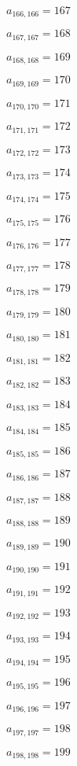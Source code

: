\documentclass[a4paper,12pt]{article}
\begin{document}
$a _{ 166, 166 } = 167$

$a _{ 167, 167 } = 168$

$a _{ 168, 168 } = 169$

$a _{ 169, 169 } = 170$

$a _{ 170, 170 } = 171$

$a _{ 171, 171 } = 172$

$a _{ 172, 172 } = 173$

$a _{ 173, 173 } = 174$

$a _{ 174, 174 } = 175$

$a _{ 175, 175 } = 176$

$a _{ 176, 176 } = 177$

$a _{ 177, 177 } = 178$

$a _{ 178, 178 } = 179$

$a _{ 179, 179 } = 180$

$a _{ 180, 180 } = 181$

$a _{ 181, 181 } = 182$

$a _{ 182, 182 } = 183$

$a _{ 183, 183 } = 184$

$a _{ 184, 184 } = 185$

$a _{ 185, 185 } = 186$

$a _{ 186, 186 } = 187$

$a _{ 187, 187 } = 188$

$a _{ 188, 188 } = 189$

$a _{ 189, 189 } = 190$

$a _{ 190, 190 } = 191$

$a _{ 191, 191 } = 192$

$a _{ 192, 192 } = 193$

$a _{ 193, 193 } = 194$

$a _{ 194, 194 } = 195$

$a _{ 195, 195 } = 196$

$a _{ 196, 196 } = 197$

$a _{ 197, 197 } = 198$

$a _{ 198, 198 } = 199$
\end{document}
